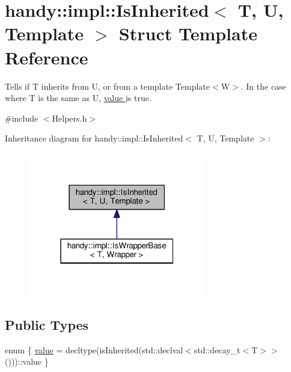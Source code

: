 \hypertarget{structhandy_1_1impl_1_1IsInherited}{}\section{handy\+:\+:impl\+:\+:Is\+Inherited$<$ T, U, Template $>$ Struct Template Reference}
\label{structhandy_1_1impl_1_1IsInherited}


Tells if {\ttfamily T} inherits from {\ttfamily U}, or from a template {\ttfamily Template$<$\+W$>$}. In the case where {\ttfamily T} is the same as {\ttfamily U}, \hyperlink{structhandy_1_1impl_1_1IsInherited_ade331c690ccfcc4c9fbe160b83f9491ba3347f5ab27dd0282a949005f868dcde7}{value } is {\ttfamily true}.  




{\ttfamily \#include $<$Helpers.\+h$>$}



Inheritance diagram for handy\+:\+:impl\+:\+:Is\+Inherited$<$ T, U, Template $>$\+:\nopagebreak
\begin{figure}[H]
\begin{center}
\leavevmode
\includegraphics[width=220pt]{structhandy_1_1impl_1_1IsInherited__inherit__graph}
\end{center}
\end{figure}
\subsection*{Public Types}
\begin{DoxyCompactItemize}
\item 
enum \{ \hyperlink{structhandy_1_1impl_1_1IsInherited_ade331c690ccfcc4c9fbe160b83f9491ba3347f5ab27dd0282a949005f868dcde7}{value} = decltype(is\+Inherited(std\+:\+:declval$<$std\+:\+:decay\+\_\+t$<$T$>$$>$()))\+:\+:value
 \}
\end{DoxyCompactItemize}
